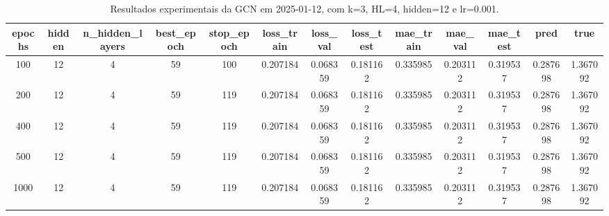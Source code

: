 \begin{table}[h]
\centering
\caption{Resultados experimentais da GCN em 2025-01-12, com k=3, HL=4, hidden=12 e lr=0.001.}
\label{tab:gcn_results_k3_hl4_h12_d20250112}
\begin{tabular}{ccccccccccccc}
\toprule
epochs & hidden & n\_hidden\_layers & best\_epoch & stop\_epoch & loss\_train & loss\_val & loss\_test & mae\_train & mae\_val & mae\_test & pred & true \\
\midrule
100 & 12 & 4 & 59 & 100 & 0.207184 & 0.068359 & 0.181162 & 0.335985 & 0.203112 & 0.319537 & 0.287698 & 1.367092 \\
200 & 12 & 4 & 59 & 119 & 0.207184 & 0.068359 & 0.181162 & 0.335985 & 0.203112 & 0.319537 & 0.287698 & 1.367092 \\
400 & 12 & 4 & 59 & 119 & 0.207184 & 0.068359 & 0.181162 & 0.335985 & 0.203112 & 0.319537 & 0.287698 & 1.367092 \\
500 & 12 & 4 & 59 & 119 & 0.207184 & 0.068359 & 0.181162 & 0.335985 & 0.203112 & 0.319537 & 0.287698 & 1.367092 \\
1000 & 12 & 4 & 59 & 119 & 0.207184 & 0.068359 & 0.181162 & 0.335985 & 0.203112 & 0.319537 & 0.287698 & 1.367092 \\
\bottomrule
\end{tabular}
\end{table}
